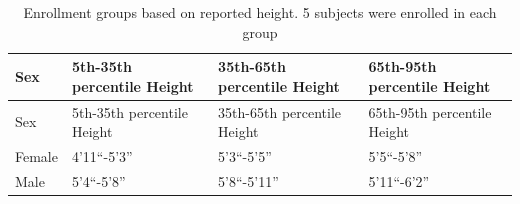 \documentclass[preprint]{elsarticle}
\begin{document}
\hypertarget{tbl:groups}{}
\begin{longtable}[]{@{}llll@{}}
\caption{\label{tbl:groups}Enrollment groups based on reported height. 5 subjects were enrolled in each group}\tabularnewline
\toprule
\begin{minipage}[b]{0.06\columnwidth}\raggedright
Sex\strut
\end{minipage} & \begin{minipage}[b]{0.27\columnwidth}\raggedright
5th-35th percentile Height\strut
\end{minipage} & \begin{minipage}[b]{0.28\columnwidth}\raggedright
35th-65th percentile Height\strut
\end{minipage} & \begin{minipage}[b]{0.28\columnwidth}\raggedright
65th-95th percentile Height\strut
\end{minipage}\tabularnewline
\midrule
\endfirsthead
\toprule
\begin{minipage}[b]{0.06\columnwidth}\raggedright
Sex\strut
\end{minipage} & \begin{minipage}[b]{0.27\columnwidth}\raggedright
5th-35th percentile Height\strut
\end{minipage} & \begin{minipage}[b]{0.28\columnwidth}\raggedright
35th-65th percentile Height\strut
\end{minipage} & \begin{minipage}[b]{0.28\columnwidth}\raggedright
65th-95th percentile Height\strut
\end{minipage}\tabularnewline
\midrule
\endhead
\begin{minipage}[t]{0.06\columnwidth}\raggedright
Female\strut
\end{minipage} & \begin{minipage}[t]{0.27\columnwidth}\raggedright
4'11``-5'3''\strut
\end{minipage} & \begin{minipage}[t]{0.28\columnwidth}\raggedright
5'3``-5'5''\strut
\end{minipage} & \begin{minipage}[t]{0.28\columnwidth}\raggedright
5'5``-5'8''\strut
\end{minipage}\tabularnewline
\begin{minipage}[t]{0.06\columnwidth}\raggedright
Male\strut
\end{minipage} & \begin{minipage}[t]{0.27\columnwidth}\raggedright
5'4``-5'8''\strut
\end{minipage} & \begin{minipage}[t]{0.28\columnwidth}\raggedright
5'8``-5'11''\strut
\end{minipage} & \begin{minipage}[t]{0.28\columnwidth}\raggedright
5'11``-6'2''\strut
\end{minipage}\tabularnewline
\bottomrule
\end{longtable}
\end{document}
